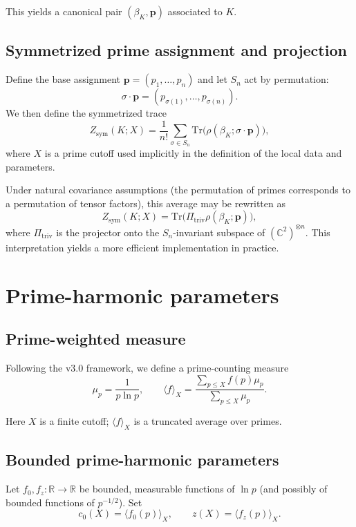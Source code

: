 \documentclass[11pt]{article}
\begin{document}
This yields a canonical pair $(\beta_K,\mathbf p)$ associated to $K$.

\subsection{Symmetrized prime assignment and projection}

Define the base assignment $\mathbf p=(p_1,\dots,p_n)$ and let $S_n$ act by permutation:
\[
  \sigma\cdot\mathbf p = (p_{\sigma(1)},\dots,p_{\sigma(n)}).
\]
We then define the symmetrized trace
\[
  Z_{\mathrm{sym}}(K;X)
  = \frac1{n!}\sum_{\sigma\in S_n}
    \mathrm{Tr}\bigl(\rho(\beta_K;\sigma\cdot\mathbf p)\bigr),
\]
where $X$ is a prime cutoff used implicitly in the definition of the local data and parameters.

Under natural covariance assumptions (the permutation of primes corresponds to a permutation of tensor factors), this average may be rewritten as
\[
  Z_{\mathrm{sym}}(K;X)
  = \mathrm{Tr}\bigl(\Pi_{\mathrm{triv}}\rho(\beta_K;\mathbf p)\bigr),
\]
where $\Pi_{\mathrm{triv}}$ is the projector onto the $S_n$-invariant subspace of $(\mathbb C^2)^{\otimes n}$.
This interpretation yields a more efficient implementation in practice.

\section{Prime-harmonic parameters}

\subsection{Prime-weighted measure}

Following the v3.0 framework, we define a prime-counting measure
\[
  \mu_p = \frac{1}{p\ln p},\qquad
  \langle f\rangle_X
   = \frac{\sum_{p\le X} f(p)\mu_p}{\sum_{p\le X}\mu_p}.
\]

Here $X$ is a finite cutoff; $\langle f\rangle_X$ is a truncated average over primes.

\subsection{Bounded prime-harmonic parameters}

Let $f_0,f_z:\mathbb R\to\mathbb R$ be bounded, measurable functions of $\ln p$ (and possibly of bounded functions of $p^{-1/2}$).
Set
\[
  c_0(X) = \langle f_0(p)\rangle_X,\qquad
  z(X)   = \langle f_z(p)\rangle_X.
\]
\end{document}
